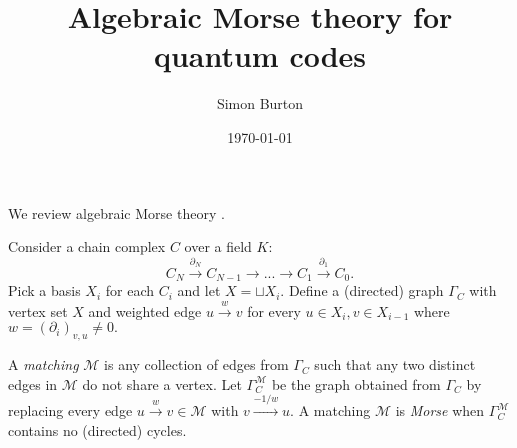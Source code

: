 \documentclass[11pt,oneside]{article}
\title{Algebraic Morse theory for quantum codes}
\author{Simon Burton}
\date{\today}
\newcommand{\MM}{\mathcal{M}}
\begin{document}
\maketitle

We review algebraic Morse theory 
\cite{Jollenbeck2005,Kozlov2005,Skoldberg2006}.

Consider a chain complex $C$ over a field $K$:
$$
    C_N \xrightarrow{\partial_N} C_{N-1}
    \to ...
    \to C_1 \xrightarrow{\partial_1} C_0.
$$
Pick a basis $X_i$ for each $C_i$
and let $X=\sqcup X_i$.
Define a (directed) graph $\Gamma_C$
with vertex set $X$ and
weighted edge $u\xrightarrow{w}v$
for every $u\in X_i, v\in X_{i-1}$
where $w = (\partial_i)_{v,u} \ne 0.$

A {\it matching} $\MM$ is any collection of
edges from $\Gamma_C$ such that 
any two distinct edges in $\MM$ do not share a vertex.
Let $\Gamma_C^\MM$ be the graph obtained from
$\Gamma_C$ by replacing every edge $u\xrightarrow{w} v\in \MM$
with $v\xrightarrow{-1/w} u.$
A matching $\MM$ is {\it Morse} when
$\Gamma_C^\MM$ contains no (directed) cycles.



{}

\end{document}
